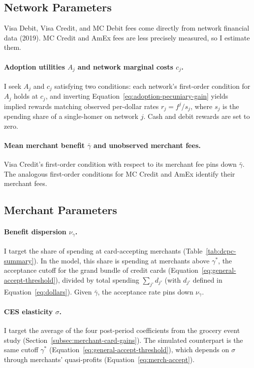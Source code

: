 \documentclass[main.tex]{subfiles}
\begin{document}
\subsection{Network Parameters\label{subsec:appendix-estim-network}}

Visa Debit, Visa Credit, and MC Debit fees come directly from network financial data (2019). MC Credit and AmEx fees are less precisely measured, so I estimate them.

\paragraph{Adoption utilities $A_j$ and network marginal costs $c_j$.} I seek $A_j$ and $c_j$ satisfying two conditions: each network's first-order condition for $A_j$ holds at $c_j$, and inverting Equation~\ref{eq:adoption-pecuniary-gain} yields implied rewards matching observed per-dollar rates $r_j = f^j / s_j$, where $s_j$ is the spending share of a single-homer on network $j$.
Cash and debit rewards are set to zero.

\paragraph{Mean merchant benefit $\bar{\gamma}$ and unobserved merchant fees.} Visa Credit's first-order condition with respect to its merchant fee pins down $\bar{\gamma}$.
The analogous first-order conditions for MC Credit and AmEx identify their merchant fees.

\subsection{Merchant Parameters\label{subsec:appendix-estim-merch}}

\paragraph{Benefit dispersion $\nu_\gamma$.} I target the share of spending at card-accepting merchants (Table~\ref{tab:dcpc-summary}).
In the model, this share is spending at merchants above $\gamma^*$, the acceptance cutoff for the grand bundle of credit cards (Equation~\ref{eq:general-accept-threshold}), divided by total spending $\sum_{j'} d_{j'}$ (with $d_{j'}$ defined in Equation~\ref{eq:dollars}).
Given $\bar{\gamma}$, the acceptance rate pins down $\nu_\gamma$.

\paragraph{CES elasticity $\sigma$.} I target the average of the four post-period coefficients from the grocery event study (Section~\ref{subsec:merchant-card-gains}).
The simulated counterpart is the same cutoff $\gamma^*$ (Equation~\ref{eq:general-accept-threshold}), which depends on $\sigma$ through merchants' quasi-profits (Equation~\ref{eq:merch-accept}).
\end{document}
